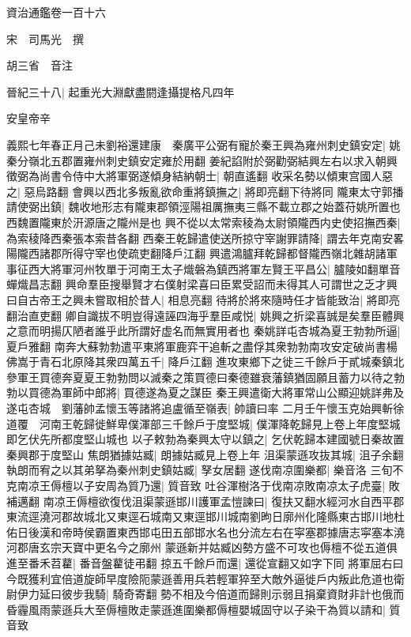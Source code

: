 資治通鑑卷一百十六

宋　司馬光　撰

胡三省　音注

晉紀三十八|{
	起重光大淵獻盡閼逢攝提格凡四年}


安皇帝辛

義熙七年春正月己未劉裕還建康　秦廣平公弼有寵於秦王興為雍州刺史鎮安定|{
	姚秦分嶺北五郡置雍州刺史鎮安定雍於用翻}
姜紀諂附於弼勸弼結興左右以求入朝興徵弼為尚書令侍中大將軍弼遂傾身結納朝士|{
	朝直遙翻}
收采名勢以傾東宫國人惡之|{
	惡烏路翻}
會興以西北多叛亂欲命重將鎮撫之|{
	將即亮翻下待將同}
隴東太守郭播請使弼出鎮|{
	魏收地形志有隴東郡領涇陽祖厲撫夷三縣不載立郡之始蓋苻姚所置也西魏置隴東於汧源唐之隴州是也}
興不從以太常索稜為太尉領隴西内史使招撫西秦|{
	為索稜降西秦張本索昔各翻}
西秦王乾歸遣使送所掠守宰謝罪請降|{
	謂去年克南安畧陽隴西諸郡所得守宰也使疏吏翻降戶江翻}
興遣鴻臚拜乾歸都督隴西嶺北雜胡諸軍事征西大將軍河州牧單于河南王太子熾磐為鎮西將軍左賢王平昌公|{
	臚陵如翻單音蟬熾昌志翻}
興命羣臣搜舉賢才右僕射梁喜曰臣累受詔而未得其人可謂世之乏才興曰自古帝王之興未嘗取相於昔人|{
	相息亮翻}
待將於將來隨時任才皆能致治|{
	將即亮翻治直吏翻}
卿自識拔不明豈得遠誣四海乎羣臣咸悦|{
	姚興之折梁喜誠是矣羣臣體興之意而明揚仄陋者誰乎此所謂好虚名而無實用者也}
秦姚詳屯杏城為夏王勃勃所逼|{
	夏戶雅翻}
南奔大蘇勃勃遣平東將軍鹿弈干追斬之盡俘其衆勃勃南攻安定破尚書楊佛嵩于青石北原降其衆四萬五千|{
	降戶江翻}
進攻東鄉下之徙三千餘戶于貳城秦鎮北參軍王買德奔夏夏王勃勃問以滅秦之策買德曰秦德雖衰藩鎮猶固願且蓄力以待之勃勃以買德為軍師中郎將|{
	買德遂為夏之謀臣}
秦王興遣衛大將軍常山公顯迎姚詳弗及遂屯杏城　劉藩帥孟懷玉等諸將追盧循至嶺表|{
	帥讀曰率}
二月壬午懷玉克始興斬徐道覆　河南王乾歸徙鮮卑僕渾部三千餘戶于度堅城|{
	僕渾降乾歸見上卷上年度堅城即乞伏先所都度堅山城也}
以子敕勃為秦興太守以鎮之|{
	乞伏乾歸本建國號日秦故置秦興郡于度堅山}
焦朗猶據姑臧|{
	朗據姑臧見上卷上年}
沮渠蒙遜攻抜其城|{
	沮子余翻}
執朗而宥之以其弟拏為秦州刺史鎮姑臧|{
	孥女居翻}
遂伐南凉圍樂都|{
	樂音洛}
三旬不克南凉王傉檀以子安周為質乃還|{
	質音致}
吐谷渾樹洛于伐南凉敗南凉太子虎臺|{
	敗補邁翻}
南凉王傉檀欲復伐沮渠蒙遜邯川護軍孟愷諫曰|{
	復扶又翻水經河水自西平郡東流逕澆河郡故城北又東逕石城南又東逕邯川城南劉昫日廓州化隆縣東古邯川地杜佑日後漢和帝時侯霸置東西邯屯田五部邯水名也分流左右在寜塞郡據唐志寜塞本澆河郡唐玄宗天寶中更名今之廓州}
蒙遜新并姑臧凶勢方盛不可攻也傉檀不從五道俱進至番禾苕藋|{
	番音盤藋徒弔翻}
掠五千餘戶而還|{
	還從宣翻又如字下同}
將軍屈右曰今既獲利宜倍道旋師早度險阨蒙遜善用兵若輕軍猝至大敵外逼徙戶内叛此危道也衛尉伊力延曰彼步我騎|{
	騎奇寄翻}
勢不相及今倍道而歸則示弱且捐棄資財非計也俄而昏霾風雨蒙遜兵大至傉檀敗走蒙遜進圍樂都傉檀嬰城固守以子染干為質以請和|{
	質音致}
